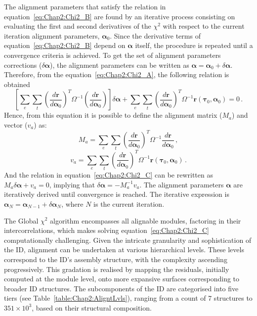 The alignment parameters that satisfy the relation in equation~\ref{eq:Chap2:Chi2_B} are found 
by an iterative process consisting on evaluating the first and second derivatives
of the $\chi^{2}$ with respect to the current iteration alignment parameters, $\bm{\alpha}_{0}$.
Since the derivative terms of equation~\ref{eq:Chap2:Chi2_B} depend on $\bm{\alpha}$ itself, 
the procedure is repeated until a convergence criteria is achieved.
To get the set of alignment parameters corrections ($\delta \bm{\alpha}$), the alignment parameters
can be written as $\bm{\alpha} = \bm{\alpha}_{0} + \delta\bm{\alpha}$. 
Therefore, from the equation~\ref{eq:Chap2:Chi2_A}, the following relation is obtained 
 \begin{equation}\label{eq:Chap2:Chi2_C}
 	\left[ \sum_{e}\sum_{t} \left( \frac{d\bm{r}}{d\bm{\alpha}_{0}}\right)^{T}\Omega^{-1}\left( \frac{d\bm{r}}{d\bm{\alpha}_{0}}\right)\right]\delta\bm{\alpha}
	+
	\sum_{e}\sum_{t} \left(\frac{d\bm{r}}{d\bm{\alpha}_{0}}\right)^{T}\Omega^{-1}\bm{r}(\bm{\tau}_{0}, \bm{\alpha}_{0}) 
	= 0 \,.
\end{equation}
Hence, from this equation it is possible to define the alignment matrix ($M_{a}$) and vector ($v_a$) as:
\begin{equation*}
	M_{a} = \sum_{e}\sum_{t} \left(\frac{d\bm{r}}{d\bm{\alpha}_{0}}\right)^{T}\Omega^{-1}\frac{d\bm{r}}{d\bm{\alpha}_{0}} \, ,
\end{equation*}
\begin{equation*}
	v_{a} = \sum_{e}\sum_{t} \left(\frac{d\bm{r}}{d\bm{\alpha}_{0}}\right)^{T}\Omega^{-1}\bm{r}(\bm{\tau}_{0}, \bm{\alpha}_{0})  \, .
\end{equation*}
And the relation in equation~\ref{eq:Chap2:Chi2_C} can be rewritten as $M_{a} \delta\bm{\alpha} + v_{a} = 0$, implying
that $\delta\bm{\alpha} = -M_{a}^{-1}v_{a}$. The alignment parameters $\bm{\alpha}$ 
are iteratively derived until convergence is reached. The iterative expression is $\bm{\alpha}_{N} = \bm{\alpha}_{N-1}+\delta\bm{\alpha}_{N}$,
where $N$ is the current iteration.

The Global $\chi^2$ algorithm encompasses all alignable modules, factoring in their intercorrelations, 
which makes solving equation~\ref{eq:Chap2:Chi2_C} computationally challenging. Given the intricate granularity 
and sophistication of the ID, alignment can be undertaken at various hierarchical levels. These levels correspond 
to the ID's assembly structure, with the complexity ascending progressively. This gradation is realised 
by mapping the residuals, initially computed at the module level, onto more expansive surfaces 
corresponding to broader ID structures. The subcomponents of the ID are categorised into five tiers (see Table~\ref{table:Chap2:AligntLvls}), 
ranging from a count of 7 structures to $351\times 10^{3}$, based on their structural composition. 

